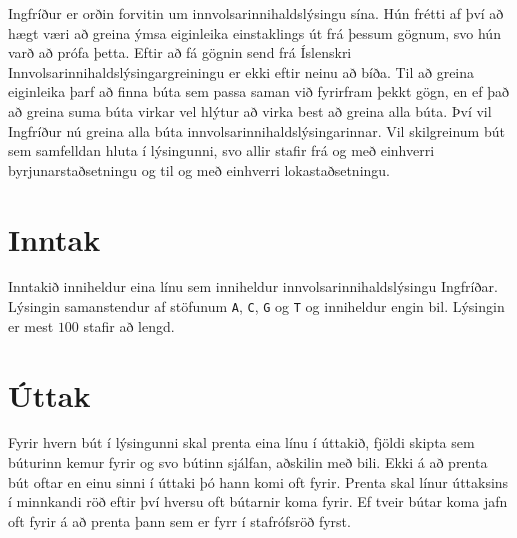 
Ingfríður er orðin forvitin um innvolsarinnihaldslýsingu sína.
Hún frétti af því að hægt
væri að greina ýmsa eiginleika einstaklings út frá þessum
gögnum, svo hún varð að prófa þetta. Eftir að fá gögnin
send frá Íslenskri Innvolsarinnihaldslýsingargreiningu
er ekki eftir neinu að bíða. Til að greina eiginleika þarf
að finna búta sem passa saman við fyrirfram þekkt gögn, en
ef það að greina suma búta virkar vel hlýtur að virka best
að greina alla búta. Því vil Ingfríður nú greina alla búta
innvolsarinnihaldslýsingarinnar. Vil skilgreinum bút sem
samfelldan hluta í lýsingunni, svo allir stafir frá og með
einhverri byrjunarstaðsetningu og til og með einhverri
lokastaðsetningu.

\section*{Inntak}
Inntakið inniheldur eina línu sem inniheldur
innvolsarinnihaldslýsingu Ingfríðar. Lýsingin samanstendur
af stöfunum \texttt{A}, \texttt{C}, \texttt{G} og 
\texttt{T} og inniheldur engin bil. Lýsingin er mest
$100$ stafir að lengd.

\section*{Úttak}
Fyrir hvern bút í lýsingunni skal prenta eina línu í úttakið,
fjöldi skipta sem búturinn kemur fyrir og svo bútinn sjálfan,
aðskilin með bili. Ekki á að prenta bút oftar en einu sinni
í úttaki þó hann komi oft fyrir.
Prenta skal línur úttaksins í minnkandi röð eftir því
hversu oft bútarnir koma fyrir.
Ef tveir bútar koma jafn oft fyrir á að prenta þann sem
er fyrr í stafrófsröð fyrst.
